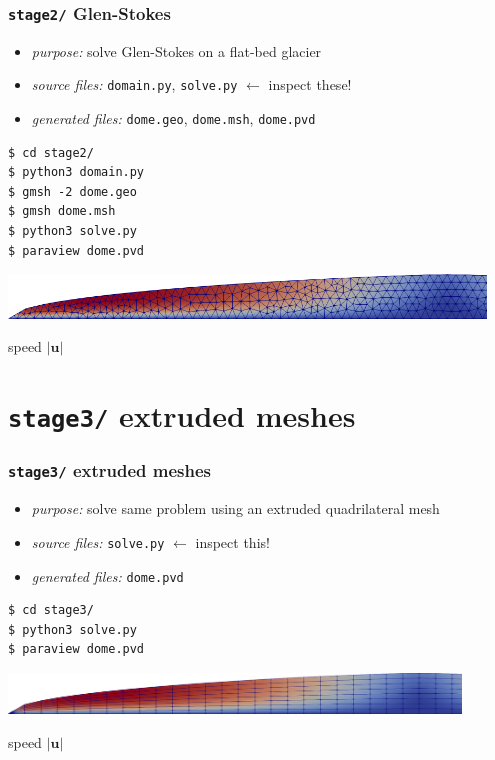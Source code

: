 \documentclass[10pt,
               hyperref={colorlinks,citecolor=DeepPink4,linkcolor=black,urlcolor=blue},
               svgnames]{beamer}
\newcommand{\bu}{\mathbf{u}}
\begin{document}
\begin{frame}[fragile]
\frametitle{\texttt{stage2/} \qquad Glen-Stokes}

\begin{itemize}
\item \emph{purpose:} solve Glen-Stokes on a flat-bed glacier
\item \emph{source files:} \texttt{domain.py}, \texttt{solve.py} \hfill \alert{$\gets$ inspect these!}
\item \emph{generated files:} \texttt{dome.geo}, \texttt{dome.msh}, \texttt{dome.pvd}
\end{itemize}

\bigskip
\begin{Verbatim}
$ cd stage2/
$ python3 domain.py
$ gmsh -2 dome.geo
$ gmsh dome.msh
$ python3 solve.py
$ paraview dome.pvd
\end{Verbatim}

\vspace{6mm}
\begin{center}
\includegraphics[width=0.95\textwidth]{figs/stage2.png}

{\tiny speed $|\bu|$}
\end{center}
\end{frame}


\section{\texttt{stage3/} \qquad extruded meshes}

\begin{frame}[fragile]
\frametitle{\texttt{stage3/} \qquad extruded meshes}

\begin{itemize}
\item \emph{purpose:} solve same problem using an extruded quadrilateral mesh
\item \emph{source files:} \texttt{solve.py} \hfill \alert{$\gets$ inspect this!}
\item \emph{generated files:} \texttt{dome.pvd}
\end{itemize}

\bigskip
\begin{Verbatim}
$ cd stage3/
$ python3 solve.py
$ paraview dome.pvd
\end{Verbatim}

\vspace{10mm}
\begin{center}
\includegraphics[width=0.9\textwidth]{figs/stage3.png}

{\tiny speed $|\bu|$}
\end{center}
\end{frame}
\end{document}
